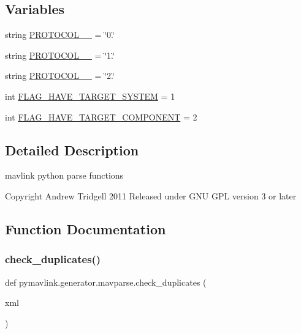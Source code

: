 \subsection*{Variables}
\begin{DoxyCompactItemize}
\item 
string \mbox{\hyperlink{namespacepymavlink_1_1generator_1_1mavparse_a2f1946ee948a684dcbdd0bf5afee5689}{P\+R\+O\+T\+O\+C\+O\+L\+\_\+\_}} = \char`\"{}0.\char`\"{}
\item 
string \mbox{\hyperlink{namespacepymavlink_1_1generator_1_1mavparse_ab308d4fdc1b0fbcfa2789aa6af08f46e}{P\+R\+O\+T\+O\+C\+O\+L\+\_\+\_}} = \char`\"{}1.\char`\"{}
\item 
string \mbox{\hyperlink{namespacepymavlink_1_1generator_1_1mavparse_a87817b2175b76fab09524650d04cd139}{P\+R\+O\+T\+O\+C\+O\+L\+\_\+\_}} = \char`\"{}2.\char`\"{}
\item 
int \mbox{\hyperlink{namespacepymavlink_1_1generator_1_1mavparse_aa767ba97b2d56ec79d71110d223fa05a}{F\+L\+A\+G\+\_\+\+H\+A\+V\+E\+\_\+\+T\+A\+R\+G\+E\+T\+\_\+\+S\+Y\+S\+T\+EM}} = 1
\item 
int \mbox{\hyperlink{namespacepymavlink_1_1generator_1_1mavparse_ac489014afb91b659714bb125f9b22c8b}{F\+L\+A\+G\+\_\+\+H\+A\+V\+E\+\_\+\+T\+A\+R\+G\+E\+T\+\_\+\+C\+O\+M\+P\+O\+N\+E\+NT}} = 2
\end{DoxyCompactItemize}


\subsection{Detailed Description}
\begin{DoxyVerb}mavlink python parse functions

Copyright Andrew Tridgell 2011
Released under GNU GPL version 3 or later
\end{DoxyVerb}
 

\subsection{Function Documentation}
\mbox{\label{namespacepymavlink_1_1generator_1_1mavparse_aade73d992c7a3adb54e6ed2682ba97ce}} 
\subsubsection{\texorpdfstring{check\_duplicates()}{check\_duplicates()}}
{\footnotesize\ttfamily def pymavlink.\+generator.\+mavparse.\+check\+\_\+duplicates (\begin{DoxyParamCaption}\item[{}]{xml }\end{DoxyParamCaption})}

